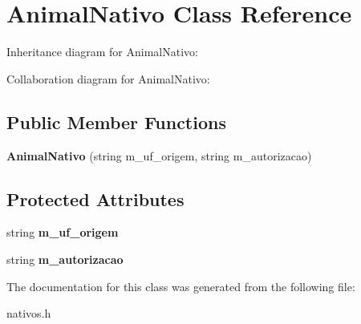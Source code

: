 \hypertarget{classAnimalNativo}{}\section{Animal\+Nativo Class Reference}
\label{classAnimalNativo}


Inheritance diagram for Animal\+Nativo\+:


Collaboration diagram for Animal\+Nativo\+:
\subsection*{Public Member Functions}
\begin{DoxyCompactItemize}
\item 
\mbox{\label{classAnimalNativo_a6df53f972ed284f2da7ac65eb3a09060}} 
{\bfseries Animal\+Nativo} (string m\+\_\+uf\+\_\+origem, string m\+\_\+autorizacao)
\end{DoxyCompactItemize}
\subsection*{Protected Attributes}
\begin{DoxyCompactItemize}
\item 
\mbox{\label{classAnimalNativo_ab0ae76915b494c83d78e9561bcbbf0a8}} 
string {\bfseries m\+\_\+uf\+\_\+origem}
\item 
\mbox{\label{classAnimalNativo_aff7f4b73f64b9ecfc7aaef75e21e5a78}} 
string {\bfseries m\+\_\+autorizacao}
\end{DoxyCompactItemize}


The documentation for this class was generated from the following file\+:\begin{DoxyCompactItemize}
\item 
nativos.\+h\end{DoxyCompactItemize}

